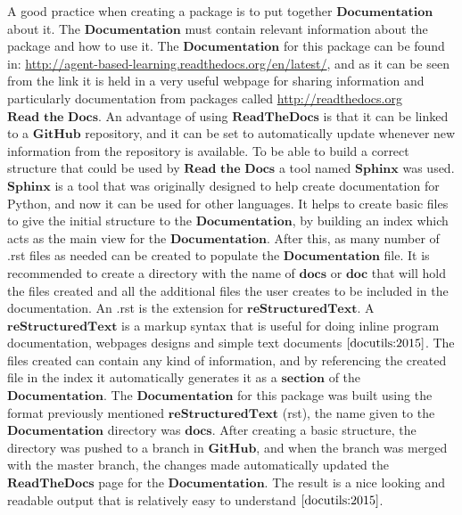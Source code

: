 A good practice when creating a package is to put together $\textbf{Documentation}$ about it. The $\textbf{Documentation}$ must contain relevant information about the package and how to use it. The $\textbf{Documentation}$ for this package can be found in:  \url{http://agent-based-learning.readthedocs.org/en/latest/}, and as it can be seen from the link it is held in a very useful webpage for sharing information and particularly documentation from packages called \url{http://readthedocs.org} $\textbf{Read the Docs}$. An advantage of using $\textbf{ReadTheDocs}$ is that it can be linked to a $\textbf{GitHub}$ repository, and it can be set to automatically update whenever new information from the repository is available.  To be able to build a correct structure that could be used by $\textbf{Read the Docs}$ a tool named  $\textbf{Sphinx}$ was used. $\textbf{Sphinx}$ is a tool that was originally designed to help create documentation for Python, and now it can be used for other languages. It helps to create basic files to give the initial structure to the $\textbf{Documentation}$, by building an index which acts as the main view for the $\textbf{Documentation}$. After this, as many number of .rst files as needed can be created to populate the $\textbf{Documentation}$ file. It is recommended to create a directory with the name of $\textbf{docs}$ or $\textbf{doc}$ that will hold the files created and all the additional files the user creates to be included in the documentation. An .rst is the extension  for  $\textbf{reStructuredText}$. A $\textbf{reStructuredText}$ is a markup syntax that is useful for doing inline program documentation, webpages designs and simple text documents $\cite{docutils:2015}$. The files created can contain any kind of information, and by referencing the created file in the index it automatically generates it as a $\textbf{section}$ of the $\textbf{Documentation}$. 
The  $\textbf{Documentation}$ for this package was built using the format previously mentioned $\textbf{reStructuredText}$ (rst), the name given to the $\textbf{Documentation}$ directory was $\textbf{docs}$. After creating a basic structure, the directory was pushed to a branch in $\textbf{GitHub}$, and when the branch was merged with the master branch, the changes made automatically updated the $\textbf{ReadTheDocs}$ page for the $\textbf{Documentation}$. The result is a nice looking and readable output that is relatively easy to understand $\cite{docutils:2015}$. 
